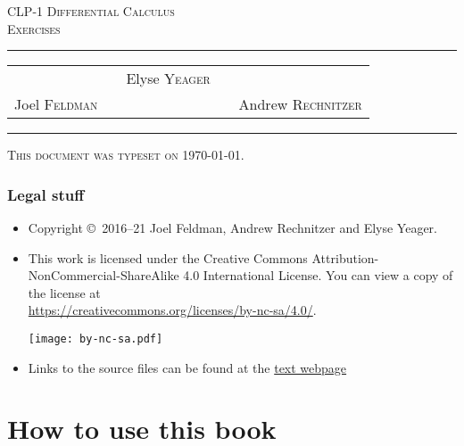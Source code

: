 \documentclass[12pt,letterpaper]{book}
\begin{document}
\setcounter{page}{0}

\begin{titlepage}
\begin{center}
\textsc{\LARGE
CLP-1 Differential Calculus\\[2ex]
Exercises
}\\[2ex]

\vspace{5ex}
\hrule
\vspace{5ex}

\begin{tabular}{lcccr}
&& \large Elyse \textsc{Yeager} \\[3ex]
 Joel \textsc{Feldman}
&\quad & &\quad&
Andrew \textsc{Rechnitzer}
\end{tabular}

\end{center}
\vspace{2ex}
\hrule

\vfill
\textsc{This document was typeset on \today.}
\end{titlepage}

\subsection*{Legal stuff}
\begin{itemize}
 \item Copyright \copyright\ 2016--21 Joel Feldman, Andrew Rechnitzer and Elyse Yeager.

\item This work is licensed under the
Creative Commons Attribution-NonCommercial-ShareAlike 4.0 International
License. You can view a copy of the license at \\
\url{https://creativecommons.org/licenses/by-nc-sa/4.0/}.
\begin{center}
 \texttt{[image: by-nc-sa.pdf]}
\end{center}


\item Links to the source files can be found at the \href{https://www.math.ubc.ca/~CLP/index.html}{text webpage}
\end{itemize}


\frontmatter

\chapter{How to use this book}

\end{document}
